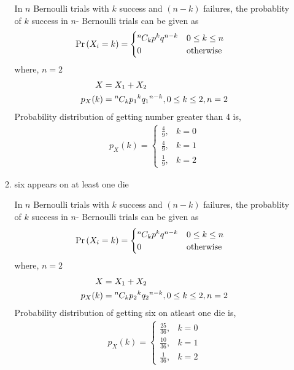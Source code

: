 \documentclass{article}
\providecommand{\pr}[1]{\ensuremath{\Pr\left(#1\right)}}
\newcommand*{\permcomb}[4][0mu]{{{}^{#3}\mkern#1#2_{#4}}}
\newcommand*{\comb}[1][-1mu]{\permcomb[#1]{C}}
\begin{document}
\begin{enumerate}[label=13.\arabic{enumi}.\arabic{enumii}]
\begin{enumerate}
In $n$ Bernoulli trials with $k$ success and $(n - k)$ failures, the probablity of $k$ success in $n$- Bernoulli trials can be given as\\
\begin{align}
\pr{X_i=k}  &= 
\begin{cases}
\comb{n}{k} p^{k}q^{n-k} & 0 \le k \le n
\\
0 & \text{otherwise}                
\end{cases}
\end{align}
where, $n = 2$
\begin{align}
X&=X_1+X_2\\
p_X(k)&=\comb{n}{k}{p_1}^{k}{q_1}^{n-k}, 0\le k\le 2,n=2
\end{align}
Probability distribution of getting number greater than 4 is,
\begin{align}
  p_X(k) =
    \begin{cases}
      \frac{4}{9}, &  k = 0\\
      \frac{4}{9}, & k = 1\\
      \frac{1}{9}, & k = 2
    \end{cases}       
\end{align}
\item six appears on at least one die

In $n$ Bernoulli trials with $k$ success and $(n - k)$ failures, the probablity of $k$ success in $n$- Bernoulli trials can be given as\\
\begin{align}
\pr{X_i=k}  &= 
\begin{cases}
\comb{n}{k} p^{k}q^{n-k} & 0 \le k \le n
\\
0 & \text{otherwise}                
\end{cases}
\end{align}
where, $n = 2$
\begin{align}
X&=X_1+X_2\\
p_X(k)&=\comb{n}{k}{p_2}^{k}{q_2}^{n-k}, 0\le k\le 2,n=2
\end{align}
Probability distribution of getting six on atleast one die is,
\begin{align}
  p_{X}(k) =
    \begin{cases}
      \frac{25}{36}, &  k = 0\\
      \frac{10}{36}, & k = 1\\
      \frac{1}{36}, & k = 2
    \end{cases}       
\end{align}
\end{enumerate}
\end{enumerate}
\end{document}
